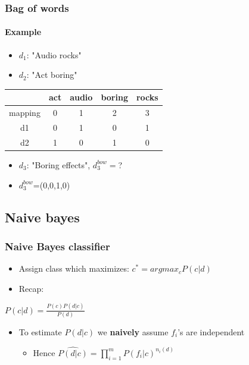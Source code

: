 \documentclass{beamer}
\begin{document}
\begin{frame}
	\frametitle{Bag of words}
	\framesubtitle{Example}
	\begin{itemize}
		\item $d_1$: "Audio rocks"
		\item $d_2$: "Act boring"
	\end{itemize}
	\begin{center}
	\begin{table}
		\begin{tabular}{c|c|c|c|c}
			& act & audio & boring & rocks \\ \hline \hline
			mapping & 0 & 1 & 2 & 3 \\ \hline
			d1 & 0 & 1 & 0 & 1 \\
			d2 & 1 & 0 & 1 & 0
		\end{tabular}
	\end{table}
	\end{center}
	
	\begin{itemize}
		\item $d_3$: "Boring effects", $d_3^{bow}=$? \pause
		\item $d_3^{bow}$=(0,0,1,0)
	\end{itemize}
\end{frame}

\subsection{Naive bayes}
\begin{frame}
	\frametitle{Naive Bayes classifier}
	\begin{itemize}
		\item Assign class which maximizes: $c^{*}=argmax_{c} P(c|d)$
		\pause
		\item Recap:
	\end{itemize}
	
	\begin{Definition}
		\center
		$P(c|d) = \frac{P(c)P(d|c)}{P(d)}$
	\end{Definition}
	\pause
	\begin{itemize}
		\item To estimate $P(d|c)$ we \textbf{naively} assume $f_i$'s are independent
		\pause
		\begin{itemize}
			\item Hence $\widehat{P(d|c)}=\prod_{i=1}^{m}P(f_i|c)^{n_i(d)}$ 
		\end{itemize}
	\end{itemize}
\end{frame}
\end{document}
